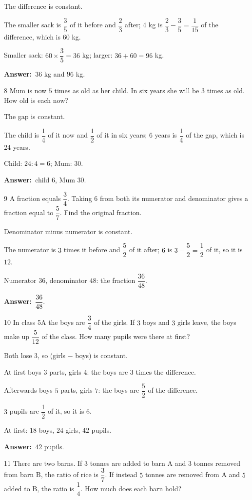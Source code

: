 \documentclass[11pt]{article}
\newif\ifsol \solfalse
\providecommand{\AnsWord}{Đáp số}
\newcommand{\dapso}[1]{\par\textbf{\AnsWord:}\ #1}
\newcommand{\probsol}[1]{%
  \begin{lrbox}{\solmeasure}\begin{minipage}{\dimexpr\linewidth-24pt\relax}#1\end{minipage}\end{lrbox}%
  \ifsol
    \begin{solbox}#1\end{solbox}%
  \else
    \setlength{\solht}{\dimexpr\ht\solmeasure+\dp\solmeasure+0.85cm\relax}%
    \ifdim\solht<1.35cm\setlength{\solht}{1.35cm}\fi
    \begin{tcolorbox}[colback=white,colframe=Line,boxrule=0.8pt,arc=5pt,
      left=8pt,right=8pt,top=4pt,bottom=4pt,height=\solht]{\footnotesize\color{Slate}\itshape\WorkWord}\end{tcolorbox}%
  \fi}
\newcommand{\gap}{\vspace{0.3cm}}
\def\WorkWord{Your work:}
\def\AnsWord{Answer}
\begin{document}
\probsol{
The difference is constant.\par The smaller sack is $\dfrac35$ of it before and $\dfrac23$ after; $4$ kg is $\dfrac23-\dfrac35=\dfrac1{15}$ of the difference, which is $60$ kg.\par
Smaller sack: $60\times\dfrac35=36$ kg; larger: $36+60=96$ kg.
\dapso{$36$ kg and $96$ kg.}}
\gap
\begin{probbox}{8}{\relax}
Mum is now $5$ times as old as her child. In six years she will be $3$ times as old. How old is each now?
\end{probbox}
\probsol{
The gap is constant.\par The child is $\dfrac14$ of it now and $\dfrac12$ of it in six years; $6$ years is $\dfrac14$ of the gap, which is $24$ years.\par
Child: $24:4=6$; Mum: $30$.
\dapso{child $6$, Mum $30$.}}
\gap
\begin{probbox}{9}{\relax}
A fraction equals $\dfrac34$. Taking $6$ from both its numerator and denominator gives a fraction equal to $\dfrac57$. Find the original fraction.
\end{probbox}
\probsol{
Denominator minus numerator is constant.\par The numerator is $3$ times it before and $\dfrac52$ of it after; $6$ is $3-\dfrac52=\dfrac12$ of it, so it is $12$.\par
Numerator $36$, denominator $48$: the fraction $\dfrac{36}{48}$.
\dapso{$\dfrac{36}{48}$.}}
\gap
\begin{probbox}{10}{\relax}
In class 5A the boys are $\dfrac34$ of the girls. If $3$ boys and $3$ girls leave, the boys make up $\dfrac5{12}$ of the class. How many pupils were there at first?
\end{probbox}
\probsol{
Both lose $3$, so (girls $-$ boys) is constant.\par At first boys $3$ parts, girls $4$: the boys are $3$ times the difference.\par
Afterwards boys $5$ parts, girls $7$: the boys are $\dfrac52$ of the difference.\par $3$ pupils are $\dfrac12$ of it, so it is $6$.\par
At first: $18$ boys, $24$ girls, $42$ pupils.
\dapso{$42$ pupils.}}
\gap
\begin{probbox}{11}{\relax}
There are two barns. If $3$ tonnes are added to barn A and $3$ tonnes removed from barn B, the ratio of rice is $\dfrac37$. If instead $5$ tonnes are removed from A and $5$ added to B, the ratio is $\dfrac14$. How much does each barn hold?
\end{probbox}
\end{document}
